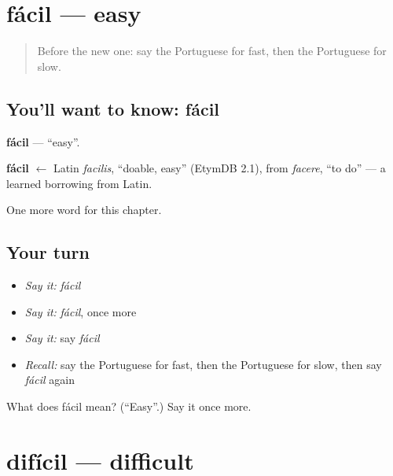 \section[fácil]{fácil — easy}

\label{lesson:PT-C66-facil}



\begin{quote}
Before the new one: say the Portuguese for fast, then the Portuguese for slow.
\end{quote}

\subsection*{You'll want to know: fácil}
\textbf{fácil} — \textquotedblleft{}easy\textquotedblright{}.

\begin{cousinweb}
\textbf{fácil} $\leftarrow$ Latin \emph{facilis}, \textquotedblleft{}doable, easy\textquotedblright{} (EtymDB 2.1), from \emph{facere}, \textquotedblleft{}to do\textquotedblright{} — a learned borrowing from Latin.
\end{cousinweb}

\begin{grammarlens}[title={What you've built}]
One more word for this chapter.
\end{grammarlens}

\subsection*{Your turn}
\begin{itemize}
\raggedright
  \item \emph{Say it:} \emph{fácil}
  \item \emph{Say it:} \emph{fácil}, once more
  \item \emph{Say it:} say \emph{fácil}
  \item \emph{Recall:} say the Portuguese for fast, then the Portuguese for slow, then say \emph{fácil} again
\end{itemize}

\begin{tcolorbox}[breakable,colback=teal!4,colframe=teal!35!black,title={Before you move on}]
What does fácil mean? (\textquotedblleft{}Easy\textquotedblright{}.) Say it once more.
\end{tcolorbox}
\section[difícil]{difícil — difficult}

